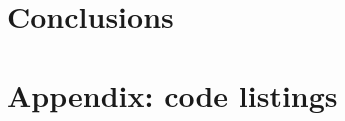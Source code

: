 \documentclass[11pt]{article}
\begin{document}
\section{Conclusions}

\newpage

\section{Appendix: code listings}



\newpage


\newpage


\newpage


\newpage

\end{document}
